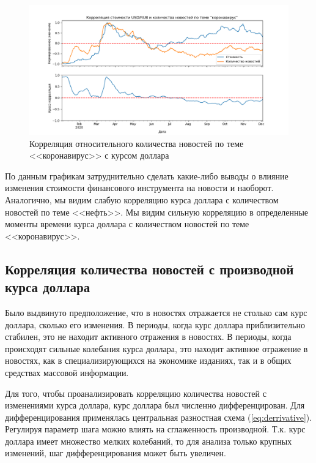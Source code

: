 \begin{figure}[h]
    \centering
    \includegraphics[width=\linewidth]{images/correlations/relative/коронавирус.png}
    \caption{Корреляция относительного количества новостей по теме <<коронавирус>> с курсом доллара}
    \label{img:correlation-relative-covid}
\end{figure}

По данным графикам затруднительно сделать какие-либо выводы о влияние изменения стоимости финансового инструмента на новости и наоборот.  Аналогично, мы видим слабую корреляцию курса доллара с количеством новостей по теме <<нефть>>. Мы видим сильную корреляцию в определенные моменты времени курса доллара с количеством новостей по теме <<коронавирус>>.

\subsection{Корреляция количества новостей с производной курса доллара}

Было выдвинуто предположение, что в новостях отражается не столько сам курс доллара, сколько его изменения. В периоды, когда курс доллара приблизительно стабилен, это не находит активного отражения в новостях. В периоды, когда происходят сильные колебания курса доллара, это находит активное отражение в новостях, как в специализирующихся на экономике изданиях, так и в общих средствах массовой информации.

Для того, чтобы проанализировать корреляцию количества новостей с изменениями курса доллара, курс доллара был численно дифференцирован. Для дифференцирования применялась центральная разностная схема (\ref{eq:derrivative}). Регулируя параметр шага можно влиять на сглаженность производной. Т.к. курс доллара имеет множество мелких колебаний, то для анализа только крупных изменений, шаг дифференцирования может быть увеличен.

